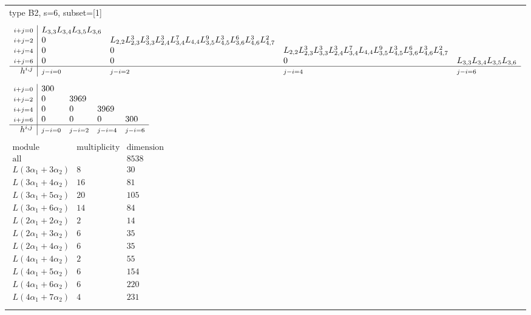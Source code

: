 \documentclass[crop,border=2mm]{standalone}
\begin{document}
\begin{tabular}{l}
{\huge type B2, s=6, subset=[1]}\\ \\


$\displaystyle
\begin{array}{r|l l l l}
	{\scriptstyle i+j=0}&L_{3,3}L_{3,4}L_{3,5}L_{3,6}&&&\\
	{\scriptstyle i+j=2}&0&L_{2,2}L_{2,3}^{3}L_{3,3}^{3}L_{2,4}^{3}L_{3,4}^{7}L_{4,4}L_{3,5}^{9}L_{4,5}^{3}L_{3,6}^{6}L_{4,6}^{3}L_{4,7}^{2}&&\\
	{\scriptstyle i+j=4}&0&0&L_{2,2}L_{2,3}^{3}L_{3,3}^{3}L_{2,4}^{3}L_{3,4}^{7}L_{4,4}L_{3,5}^{9}L_{4,5}^{3}L_{3,6}^{6}L_{4,6}^{3}L_{4,7}^{2}&\\
	{\scriptstyle i+j=6}&0&0&0&L_{3,3}L_{3,4}L_{3,5}L_{3,6}\\
	\hline h^{i,j}&{\scriptstyle j-i=0}&{\scriptstyle j-i=2}&{\scriptstyle j-i=4}&{\scriptstyle j-i=6}
\end{array}
$ \\ \\


$\displaystyle
\begin{array}{r|l l l l}
	{\scriptstyle i+j=0}&300&&&\\
	{\scriptstyle i+j=2}&0&3969&&\\
	{\scriptstyle i+j=4}&0&0&3969&\\
	{\scriptstyle i+j=6}&0&0&0&300\\
	\hline h^{i,j}&{\scriptstyle j-i=0}&{\scriptstyle j-i=2}&{\scriptstyle j-i=4}&{\scriptstyle j-i=6}
\end{array}
$ \\ \\


$\displaystyle
\begin{array}{rll}
	\text{module}&\text{multiplicity}&\text{dimension} \\ \hline \text{all}&&8538 \\
	L\left( 3\alpha_{1}+ 3\alpha_{2}\right)&8&30\\
	L\left( 3\alpha_{1}+ 4\alpha_{2}\right)&16&81\\
	L\left( 3\alpha_{1}+ 5\alpha_{2}\right)&20&105\\
	L\left( 3\alpha_{1}+ 6\alpha_{2}\right)&14&84\\
	L\left( 2\alpha_{1}+ 2\alpha_{2}\right)&2&14\\
	L\left( 2\alpha_{1}+ 3\alpha_{2}\right)&6&35\\
	L\left( 2\alpha_{1}+ 4\alpha_{2}\right)&6&35\\
	L\left( 4\alpha_{1}+ 4\alpha_{2}\right)&2&55\\
	L\left( 4\alpha_{1}+ 5\alpha_{2}\right)&6&154\\
	L\left( 4\alpha_{1}+ 6\alpha_{2}\right)&6&220\\
	L\left( 4\alpha_{1}+ 7\alpha_{2}\right)&4&231
\end{array}
$ \\ \\

\end{tabular}
\end{document}
